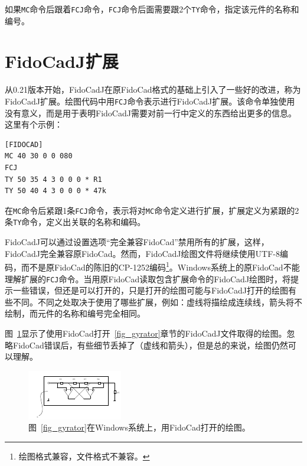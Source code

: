 \documentclass[10pt,a4paper,twoside]{scrreprt}
\begin{document}
如果\lstinline!MC!命令后跟着\lstinline!FCJ!命令，\lstinline!FCJ!命令后面需要跟2个\lstinline!TY!命令，指定该元件的名称和编号。

\section{FidoCadJ扩展}
\label{FCJ_extension}

从0.21版本开始，FidoCadJ在原FidoCad格式的基础上引入了一些好的改进，称为FidoCadJ扩展。绘图代码中用\lstinline!FCJ!命令表示进行FidoCadJ扩展。该命令单独使用没有意义，而是用于表明FidoCadJ需要对前一行中定义的东西给出更多的信息。这里有个示例：
\begin{lstlisting}
[FIDOCAD]
MC 40 30 0 0 080
FCJ
TY 50 35 4 3 0 0 0 * R1
TY 50 40 4 3 0 0 0 * 47k
\end{lstlisting}
在\lstinline!MC!命令后紧跟1条\lstinline!FCJ!命令，表示将对\lstinline!MC!命令定义进行扩展，扩展定义为紧跟的2条\lstinline!TY!命令，定义出关联的名称和编码。

FidoCadJ可以通过设置选项“完全兼容FidoCad”禁用所有的扩展，这样，FidoCadJ完全兼容原FidoCad。然而，FidoCadJ绘图文件将继续使用UTF-8编码，而不是原FidoCad的陈旧的CP-1252编码\footnote{绘图格式兼容，文件格式不兼容。}。Windows系统上的原FidoCad不能理解扩展的\lstinline!FCJ!命令。当用原FidoCad读取包含扩展命令的FidoCadJ绘图时，将提示一些错误，但还是可以打开的，只是打开的绘图可能与FidoCadJ打开的绘图有些不同。不同之处取决于使用了哪些扩展，例如：虚线将描绘成连续线，箭头将不绘制，而元件的名称和编号完全相同。

图~\ref{fig_gyrator_n}显示了使用FidoCad打开~\ref{fig_gyrator}章节的FidoCadJ文件取得的绘图。忽略FidoCad错误后，有些细节丢掉了（虚线和箭头），但是总的来说，绘图仍然可以理解。

\begin{figure}
\includegraphics[width=\textwidth]{gyrator_n}
\caption{图~\ref{fig_gyrator}在Windows系统上，用FidoCad打开的绘图。}
\label{fig_gyrator_n}
\end{figure}
\end{document}

